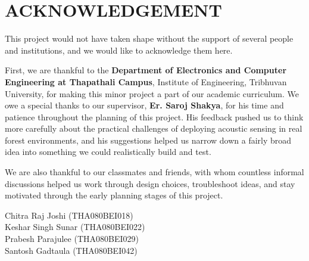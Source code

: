 \clearpage


\chapter*{\centering \textbf{ACKNOWLEDGEMENT}}

This project would not have taken shape without the support of several people and institutions, and we would like to acknowledge them here.

\vspace{0.5cm}

First, we are thankful to the\textbf{ Department of Electronics and Computer Engineering at Thapathali Campus}, Institute of Engineering, Tribhuvan University, for making this minor project a part of our academic curriculum. We owe a special thanks to our supervisor, \textbf{Er. Saroj Shakya}, for his time and patience throughout the planning of this project. His feedback pushed us to think more carefully about the practical challenges of deploying acoustic sensing in real forest environments, and his suggestions helped us narrow down a fairly broad idea into something we could realistically build and test.

\vspace{0.5cm}

We are also thankful to our classmates and friends, with whom countless informal discussions helped us work through design choices, troubleshoot ideas, and stay motivated through the early planning stages of this project.

\vspace{1cm}

Chitra Raj Joshi (THA080BEI018)\\
Keshar Singh Sunar (THA080BEI022)\\
Prabesh Parajulee (THA080BEI029)\\
Santosh Gadtaula (THA080BEI042)

\clearpage